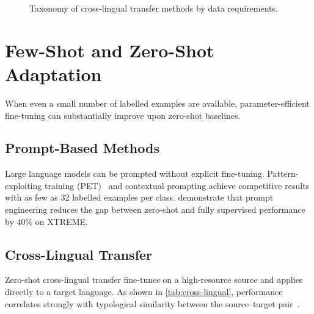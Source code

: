 \documentclass[
    language=english,
    doctype=article,
    institution=none,
    titlestyle=book,
]{../../omnilatex}
\begin{document}
\begin{figure}[htbp]
\centering
{}
\caption{Taxonomy of cross-lingual transfer methods by data requirements.}
\label{fig:taxonomy}
\end{figure}

\section{Few-Shot and Zero-Shot Adaptation}
\label{sec:fewshot}
When even a small number of labelled examples are available, parameter-efficient
fine-tuning can substantially improve upon zero-shot baselines.

\subsection{Prompt-Based Methods}
Large language models can be prompted without explicit fine-tuning.  Pattern-
exploiting training (PET)~\cite{schick2021pet} and contextual prompting achieve
competitive results with as few as 32 labelled examples per class.
\Textcite{gao2021calibrate} demonstrate that prompt engineering reduces the gap
between zero-shot and fully supervised performance by 40\% on XTREME.

\subsection{Cross-Lingual Transfer}
Zero-shot cross-lingual transfer fine-tunes on a high-resource source and
applies directly to a target language.  As shown in \cref{tab:cross-lingual},
performance correlates strongly with typological similarity between the
source--target pair~\cite{ponti2021xcopa,chi2020empirical}.
\end{document}
